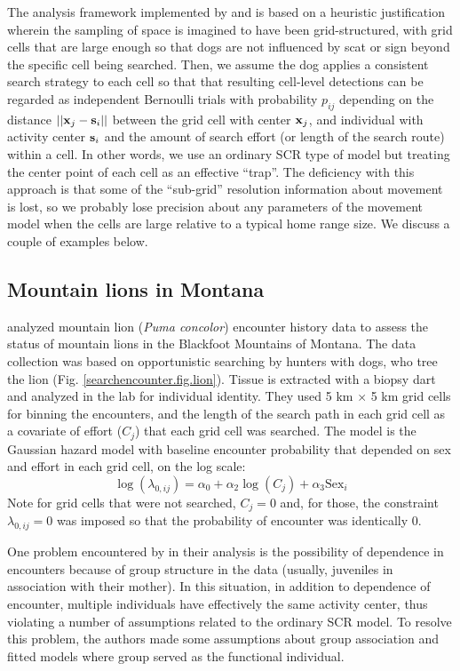 The analysis framework implemented by \citet{thompson_etal:2012} and
\citet{russell_etal:2012} is based on a heuristic justification
wherein the sampling of space is imagined to have been
grid-structured, with grid cells that are large enough so that dogs
are not influenced by scat or sign beyond the specific cell being
searched. Then, we assume the dog applies a consistent search strategy
to each cell so that that resulting cell-level detections can be
regarded as independent Bernoulli trials with probability $p_{ij}$
depending on the distance $||{\bf x}_j - {\bf s}_{i}||$ between the
grid cell with center ${\bf x}_{j}$, and individual with activity
center ${\bf s}_{i}$ and the amount of search effort (or length of the
search route) within a cell.  In other words, we use an ordinary SCR
type of model but treating the center point of each cell as an
effective ``trap''.  The deficiency with this approach is that some of
the ``sub-grid'' resolution information about movement is lost, so we
probably lose precision about any parameters of the movement model
when the cells are large relative to a typical home range size. We
discuss a couple of examples below.

\subsection{Mountain lions in Montana}

\citet{russell_etal:2012} analyzed mountain lion ({\it Puma concolor})
encounter history data to assess the status of mountain lions in the
Blackfoot Mountains of Montana.  The data collection was based on
opportunistic searching by hunters with dogs, who tree the lion
(Fig. \ref{searchencounter.fig.lion}).  Tissue is extracted with a
biopsy dart and analyzed in the lab for individual identity.  They
used 5 km $\times$ 5 km grid cells for binning the encounters, and the
length of the search path in each grid cell as a covariate of effort
($C_j$) that each grid cell was searched.  The model is the Gaussian
hazard model with baseline encounter probability that depended on sex
and effort in each grid cell, on the log scale:
\[
 \log(\lambda_{0,ij}) = \alpha_{0} + \alpha_{2} \log(C_{j}) + \alpha_{3} \mbox{Sex}_{i}
\]
Note for grid cells that were not searched, $C_{j} =0$ and, for those,
the constraint $\lambda_{0,ij}=0$ was imposed so that the probability
of encounter was identically 0.

One problem encountered by \citet{russell_etal:2012} in their analysis
is the possibility of dependence in encounters because of group
structure in the data (usually, juveniles in association with their
mother). In this situation, in addition to dependence of encounter,
multiple individuals have effectively the same activity center, thus
violating a number of assumptions related to the ordinary SCR model.
To resolve this problem, the authors made some assumptions about group
association and fitted models where group served as the functional
individual.

